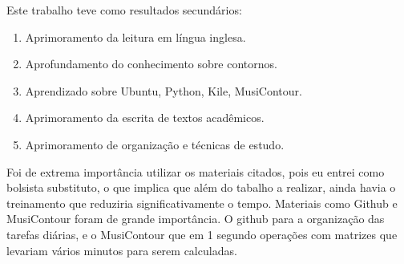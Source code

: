 \documentclass[11pt]{article}
\begin{document}
Este trabalho teve como resultados secundários:

\begin{enumerate}
\item Aprimoramento da leitura em língua inglesa.
\item Aprofundamento do conhecimento sobre contornos.
\item Aprendizado sobre Ubuntu, Python, Kile, MusiContour.
\item Aprimoramento da escrita de textos acadêmicos.
\item Aprimoramento de organização e técnicas de estudo.
\end{enumerate}

\label{sec:discussao}




Foi de extrema importância utilizar os materiais citados, pois eu entrei como bolsista
substituto, o que implica que além do tabalho a realizar, ainda havia o treinamento
que reduziria significativamente o tempo. Materiais como Github e MusiContour foram de
grande importância. O github para a organização das tarefas diárias, e o MusiContour que
em 1 segundo operações com matrizes que levariam vários minutos para serem calculadas.

\end{document}
